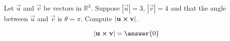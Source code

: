 \documentclass{ximera}
\author{Gregory Hartman \and Matthew Carr}
\begin{document}
\begin{exercise}



Let $\vec{u}$ and $\vec{v}$ be vectors in $\mathbb{R}^3$. Suppose $|\vec{u}|=3$, $|\vec{v}|=4$ and that the angle between $\vec{u}$ and $\vec{v}$ is $\theta=\pi$. Compute $|\mathbf{u}\boldsymbol\times\mathbf{v}|$.

\begin{prompt}
\[
|\vec{u}\cross\vec{v}|=\answer{0}
\]
\end{prompt}


\end{exercise}
\end{document}
